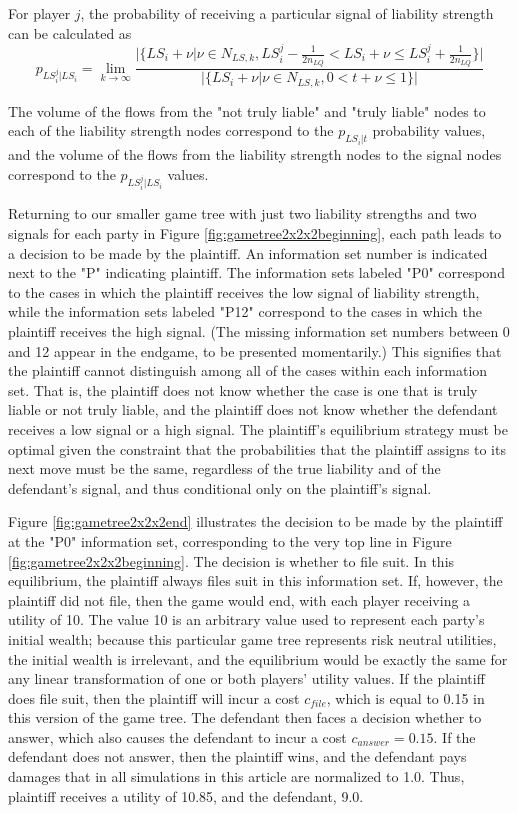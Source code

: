 \documentclass{article}
\begin{document}
For player $j$, the probability of receiving a particular signal of liability strength can be calculated as
\begin{equation} 
p_{LS_i^j|LS_i} = \lim_{k\to\infty} \frac{\lvert\{LS_i+\nu |\nu \in N_{LS,k}, LS_i^j - \frac{1}{2n_{LQ} }<LS_i+\nu \leq LS_i^j + \frac{1}{2n_{LQ} }\}\rvert}{\lvert\{LS_i+\nu |\nu \in N_{LS,k}, 0<t+\nu \leq 1 \}\rvert}
\end{equation}

\noindent The volume of the flows from the "not truly liable" and "truly liable" nodes to each of the liability strength nodes correspond to the $p_{LS_i|t}$ probability values, and the volume of the flows from the liability strength nodes to the signal nodes correspond to the $p_{LS_i^j|LS_i}$ values. 

Returning to our smaller game tree with just two liability strengths and two signals for each party in Figure \ref{fig:gametree2x2x2beginning}, each path leads to a decision to be made by the plaintiff. An information set number is indicated next to the "P" indicating plaintiff. The information sets labeled "P0" correspond to the cases in which the plaintiff receives the low signal of liability strength, while the information sets labeled "P12" correspond to the cases in which the plaintiff receives the high signal. (The missing information set numbers between 0 and 12 appear in the endgame, to be presented momentarily.) This signifies that the plaintiff cannot distinguish among all of the cases within each information set. That is, the plaintiff does not know whether the case is one that is truly liable or not truly liable, and the plaintiff does not know whether the defendant receives a low signal or a high signal. The plaintiff's equilibrium strategy must be optimal given the constraint that the probabilities that the plaintiff assigns to its next move must be the same, regardless of the true liability and of the defendant's signal, and thus conditional only on the plaintiff's signal. 

Figure \ref{fig:gametree2x2x2end} illustrates the decision to be made by the plaintiff at the "P0" information set, corresponding to the very top line in Figure \ref{fig:gametree2x2x2beginning}. The decision is whether to file suit. In this equilibrium, the plaintiff always files suit in this information set. If, however, the plaintiff did not file, then the game would end, with each player receiving a utility of 10. The value 10 is an arbitrary value used to represent each party's initial wealth; because this particular game tree represents risk neutral utilities, the initial wealth is irrelevant, and the equilibrium would be exactly the same for any linear transformation of one or both players' utility values. If the plaintiff does file suit, then the plaintiff will incur a cost $c_{file}$, which is equal to 0.15 in this version of the game tree. The defendant then faces a decision whether to answer, which also causes the defendant to incur a cost $c_{answer}=0.15$. If the defendant does not answer, then the plaintiff wins, and the defendant pays damages that in all simulations in this article are normalized to 1.0. Thus, plaintiff receives a utility of 10.85, and the defendant, 9.0.
\end{document}
